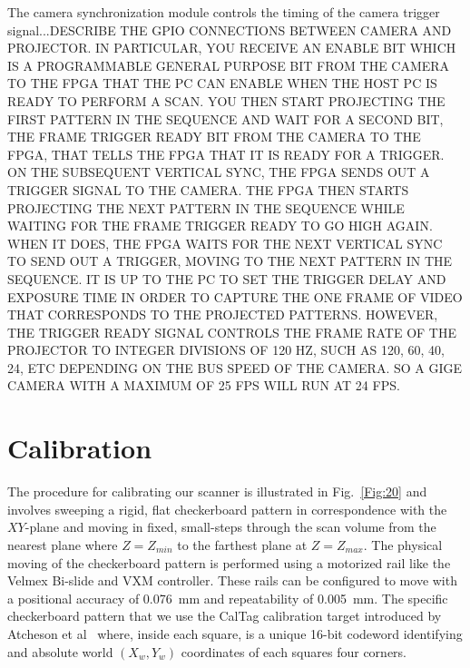 \documentclass[]{spie}  %
\begin{document}
The camera synchronization module controls the timing of the camera trigger signal...DESCRIBE THE GPIO CONNECTIONS BETWEEN CAMERA AND PROJECTOR.  IN PARTICULAR, YOU RECEIVE AN ENABLE BIT WHICH IS A PROGRAMMABLE GENERAL PURPOSE BIT FROM THE CAMERA TO THE FPGA THAT THE PC CAN ENABLE WHEN THE HOST PC IS READY TO PERFORM A SCAN.  YOU THEN START PROJECTING THE FIRST PATTERN IN THE SEQUENCE AND WAIT FOR A SECOND BIT, THE FRAME TRIGGER READY BIT FROM THE CAMERA TO THE FPGA, THAT TELLS THE FPGA THAT IT IS READY FOR A TRIGGER.  ON THE SUBSEQUENT VERTICAL SYNC, THE FPGA SENDS OUT A TRIGGER SIGNAL TO THE CAMERA.  THE FPGA THEN STARTS PROJECTING THE NEXT PATTERN IN THE SEQUENCE WHILE WAITING FOR THE FRAME TRIGGER READY TO GO HIGH AGAIN.  WHEN IT DOES, THE FPGA WAITS FOR THE NEXT VERTICAL SYNC TO SEND OUT A TRIGGER, MOVING TO THE NEXT PATTERN IN THE SEQUENCE.  IT IS UP TO THE PC TO SET THE TRIGGER DELAY AND EXPOSURE TIME IN ORDER TO CAPTURE THE ONE FRAME OF VIDEO THAT CORRESPONDS TO THE PROJECTED PATTERNS.  HOWEVER, THE TRIGGER READY SIGNAL CONTROLS THE FRAME RATE OF THE PROJECTOR TO INTEGER DIVISIONS OF 120 HZ, SUCH AS 120, 60, 40, 24, ETC DEPENDING ON THE BUS SPEED OF THE CAMERA.  SO A GIGE CAMERA WITH A MAXIMUM OF 25 FPS WILL RUN AT 24 FPS. 

\section{Calibration}
The procedure for calibrating our scanner is illustrated in Fig.~\ref{Fig:20} and involves sweeping a rigid, flat checkerboard pattern in correspondence with the $XY$-plane and moving in fixed, small-steps through the scan volume from the nearest plane where $Z = Z_{min}$ to the farthest plane at $Z = Z_{max}$.  The physical moving of the checkerboard pattern is performed using a motorized rail like the Velmex Bi-slide and VXM controller.  These rails can be configured to move with a positional accuracy of 0.076~mm and repeatability of 0.005~mm.  The specific checkerboard pattern that we use the CalTag calibration target introduced by Atcheson et al~\cite{??} where, inside each square, is a unique 16-bit codeword identifying and absolute world $(X_w,Y_w)$ coordinates of each squares four corners.
\end{document}
